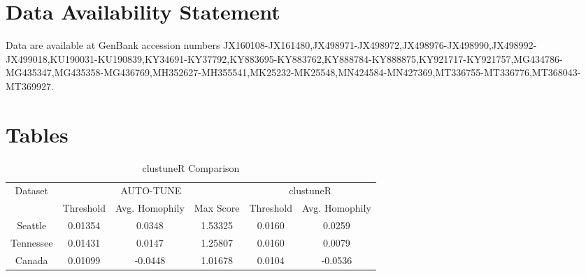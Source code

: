 \documentclass[utf8]{FrontiersinHarvard} %
\newcommand{\TODO}[1]{{\color{red}{#1}}}
\begin{document}
\section*{Data Availability Statement}

Data are available at GenBank accession numbers
JX160108-JX161480,JX498971-JX498972,JX498976-JX498990,JX498992-JX499018,KU190031-KU190839,KY34691-KY37792,KY883695-KY883762,KY888784-KY888875,KY921717-KY921757,MG434786-MG435347,MG435358-MG436769,MH352627-MH355541,MK25232-MK25548,MN424584-MN427369,MT336755-MT336776,MT368043-MT369927.


\nocite{*}


\section*{Tables}

\TODO{Add p-values for DWH, hi Steve}

\begin{table}[h]
	\caption{clustuneR Comparison}
	\vspace{8pt}
	\centering
	\label{tab:homophily}
	\begin{tabular}{|c|c|c|c|c|c|}
		\hline
		Dataset          & \multicolumn{3}{c|}{AUTO-TUNE} & \multicolumn{2}{c|}{clustuneR} \\
		\cline{2-6}
		                 & Threshold & Avg. Homophily & Max Score & Threshold & Avg. Homophily \\
		\hline
		Seattle          & 0.01354   & 0.0348         & 1.53325   & 0.0160    & 0.0259         \\
		Tennessee        & 0.01431   & 0.0147         & 1.25807   & 0.0160    & 0.0079         \\
		Canada           & 0.01099   & -0.0448        & 1.01678   & 0.0104    & -0.0536        \\
		\hline
	\end{tabular}
\end{table}
\end{document}
